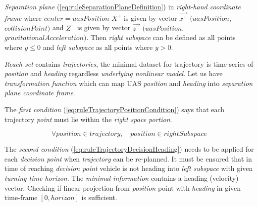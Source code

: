 \noindent \emph{Separation plane} (\ref{eq:ruleSeparationPlaneDefinition}) in \emph{right-hand coordinate frame} where $center=uasPosition$ $X^+$ is given by vector $\vec{x^+}$ $(uasPosition,$ $collisionPoint)$  and $Z^-$ is given by vector $\vec{z^-}$  $(uasPosition,$ $gravitationalAcceleration)$. Then \emph{right subspace} can be defined as all points where $y\le0$ and \emph{left subspace} as all points where $y>0$.

\emph{Reach set} contains \emph{trajectories}, the minimal dataset for trajectory is time-series of \emph{position} and \emph{heading} regardless \emph{underlying nonlinear model}. Let us have \emph{transformation function} which can map UAS \emph{position} and \emph{heading} into \emph{separation plane coordinate frame}. 

The \emph{first condition} (\ref{eq:ruleTrajectoryPositionCondition}) says that each trajectory \emph{point} must lie within the \emph{right space portion}. 

\begin{equation}\label{eq:ruleTrajectoryPositionCondition}
    \forall position \in trajectory,\quad position \in rightSubspace
\end{equation}

\noindent The \emph{second condition} (\ref{eq:ruleTrajectoryDecisionHeading}) needs to be applied for each \emph{decision point} when \emph{trajectory} can be re-planned. It must be ensured that in time of reaching \emph{decision point} vehicle is not heading into \emph{left subspace} with given \emph{turning time horizon}. The \emph{minimal information} contains a heading (velocity) vector. Checking if linear projection from \emph{position} point with \emph{heading} in given time-frame $[0,horizon]$ is sufficient.

